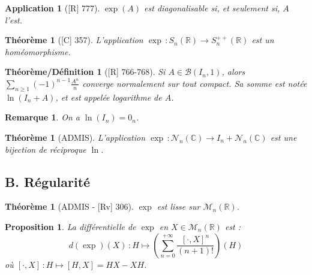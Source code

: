 \documentclass[10pt, a4paper, parskip=full, twoside, twocolumn]{report}
\newtheorem{theorem}[definition]{Théorème}
\newtheorem{theorem_def}[definition]{Théorème/Définition}
\newtheorem{proposition}[definition]{Proposition}
\newtheorem{remark}[definition]{Remarque}
\newtheorem{application}[definition]{Application}
\newcommand{\IC}{\mathbb{C}}
\newcommand{\IR}{\mathbb{R}}
\begin{document}
\begin{application}[\textnormal{[R] 777}]
	$\exp(A)$ est diagonalisable si, et seulement si, $A$ l'est.
\end{application}


\begin{tcolorbox}[
    breakable, %
    colback=developpement, %
    colframe=gray!0!black, %
    boxrule=0pt, %
    arc=1mm, %
	boxsep=0pt,
	left=0pt, right=0pt, top=0pt, bottom=0pt
]
\begin{theorem}[\textnormal{[C] 357}]
	\label{155dev1}
	L'application $\exp\,\colon S_n(\IR)\to S_n^{++}(\IR)$ est un homéomorphisme.
\end{theorem}
\end{tcolorbox}

\begin{theorem_def}[\textnormal{[R] 766-768}]
	Si $A\in \mathcal{B}(I_n, 1)$, alors $\sum_{n\geq 1}\left(-1\right)^{n-1}\frac{A^n}{n}$
	converge normalement sur tout compact. Sa somme est notée $\ln(I_n+A)$, et est appelée \emph{logarithme de $A$}.
\end{theorem_def}

\begin{remark}
	On a $\ln(I_n) = 0_n$.
\end{remark}

\begin{theorem}[ADMIS]
	L'application $\exp\,\colon \mathcal{N}_n(\IC)\to I_n + \mathcal{N}_n(\IC)$ est une 
	bijection de réciproque $\ln$.
\end{theorem}

\subsection*{B. Régularité}
\begin{theorem}[ADMIS - \textnormal{[Rv] 306}]
	$\exp$ est lisse sur $\mathcal{M}_n(\IR)$.
\end{theorem}

\begin{tcolorbox}[
    breakable, %
    colback=developpement, %
    colframe=gray!0!black, %
    boxrule=0pt, %
    arc=1mm, %
	boxsep=0pt,
	left=0pt, right=0pt, top=0pt, bottom=0pt
]
\begin{proposition}
	\label{155dev2}
	La différentielle de $\exp$ en $X\in\mathcal{M}_n(\IR)$ est :
	$$d(\exp)(X)\,\colon H\mapsto \left(\sum_{n=0}^{+\infty}\frac{[\cdot, X]^n}{(n+1)!}\right)(H)$$
	où $[\cdot, X]\,\colon H \mapsto [H, X] = HX - XH$.
\end{proposition}
\end{tcolorbox}
\end{document}
